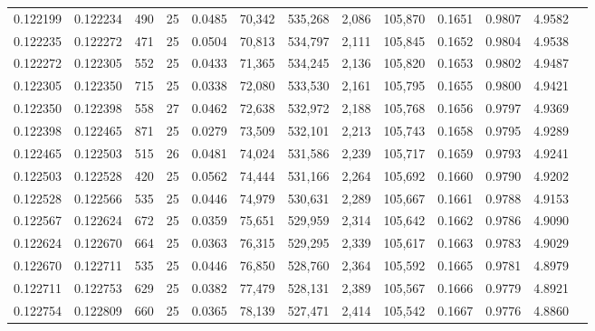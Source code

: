 \begin{tabular}{rrrrrrrrrrrrr}
0.122199 & 0.122234 &   490 &  25 &                                     0.0485 &  70,342 & 535,268 &   2,086 & 105,870 & 0.1651 & 0.9807 & 4.9582 \\
0.122235 & 0.122272 &   471 &  25 &                                     0.0504 &  70,813 & 534,797 &   2,111 & 105,845 & 0.1652 & 0.9804 & 4.9538 \\
0.122272 & 0.122305 &   552 &  25 &                                     0.0433 &  71,365 & 534,245 &   2,136 & 105,820 & 0.1653 & 0.9802 & 4.9487 \\
0.122305 & 0.122350 &   715 &  25 &                                     0.0338 &  72,080 & 533,530 &   2,161 & 105,795 & 0.1655 & 0.9800 & 4.9421 \\
0.122350 & 0.122398 &   558 &  27 &                                     0.0462 &  72,638 & 532,972 &   2,188 & 105,768 & 0.1656 & 0.9797 & 4.9369 \\
0.122398 & 0.122465 &   871 &  25 &                                     0.0279 &  73,509 & 532,101 &   2,213 & 105,743 & 0.1658 & 0.9795 & 4.9289 \\
0.122465 & 0.122503 &   515 &  26 &                                     0.0481 &  74,024 & 531,586 &   2,239 & 105,717 & 0.1659 & 0.9793 & 4.9241 \\
0.122503 & 0.122528 &   420 &  25 &                                     0.0562 &  74,444 & 531,166 &   2,264 & 105,692 & 0.1660 & 0.9790 & 4.9202 \\
0.122528 & 0.122566 &   535 &  25 &                                     0.0446 &  74,979 & 530,631 &   2,289 & 105,667 & 0.1661 & 0.9788 & 4.9153 \\
0.122567 & 0.122624 &   672 &  25 &                                     0.0359 &  75,651 & 529,959 &   2,314 & 105,642 & 0.1662 & 0.9786 & 4.9090 \\
0.122624 & 0.122670 &   664 &  25 &                                     0.0363 &  76,315 & 529,295 &   2,339 & 105,617 & 0.1663 & 0.9783 & 4.9029 \\
0.122670 & 0.122711 &   535 &  25 &                                     0.0446 &  76,850 & 528,760 &   2,364 & 105,592 & 0.1665 & 0.9781 & 4.8979 \\
0.122711 & 0.122753 &   629 &  25 &                                     0.0382 &  77,479 & 528,131 &   2,389 & 105,567 & 0.1666 & 0.9779 & 4.8921 \\
0.122754 & 0.122809 &   660 &  25 &                                     0.0365 &  78,139 & 527,471 &   2,414 & 105,542 & 0.1667 & 0.9776 & 4.8860 \\

\end{tabular}
